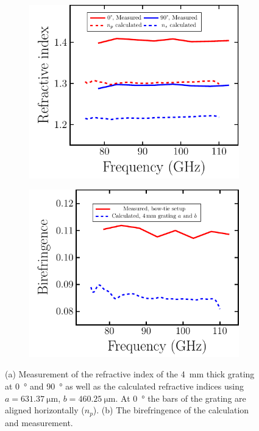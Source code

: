 \begin{figure}[H]
    \begin{subfigure}[b]{.5\linewidth}
    \caption{}
    \centering\includegraphics[scale=0.6]{images/results/plots/polymer/ri_slim_grating_a.pdf}
    \end{subfigure}%
    \begin{subfigure}[b]{.5\linewidth}
    \caption{}
    \centering\includegraphics[scale=0.6]{images/results/plots/polymer/ri_slim_grating_b.pdf}
    \end{subfigure}
    \caption{(a) Measurement of the refractive index of the \SI{4}{\milli \meter} thick grating at \SI{0}{\degree} and \SI{90}{\degree} as well as the calculated refractive indices using $a=\SI{631.37}{\micro \meter}$, $b=\SI{460.25}{\micro\meter}$. At \SI{0}{\degree} the bars of the grating are aligned horizontally ($n_p$). (b) The birefringence of the calculation and measurement.}
    \label{fig:ri_slim_grating}
\end{figure}

